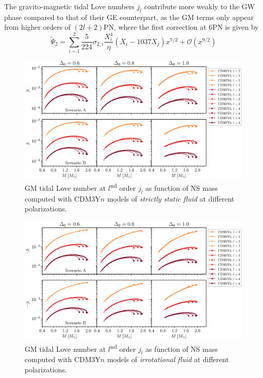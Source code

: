 The gravito-magnetic tidal Love numbers $j_l$ contribute more weakly to the \gls{GW} phase compared to that of their \gls{GE} counterpart, as the \gls{GM} terms only appear from higher orders of $(2l+2)$PN, where the first correction at 6PN is given by \citep{perot2021role,yagi2017erratum}
\begin{equation}
    \tilde{\Psi}_2 = \sum^{2}_{i=1} \frac{5}{224} \sigma_{2,i} \frac{X_i^4}{\eta} \left( X_i - 1037X_j \right)x^{7/2} + \mathcal{O}(x^{9/2})
\end{equation}
\begin{figure}[ht!]
        \centering
        \includegraphics[width=\textwidth]{fig/jl_stat.eps}
        \caption{\gls{GM} tidal Love number at $l$\textsuperscript{nd} order $j_l$ as function of \gls{NS} mass computed with CDM3Y$n$ models of \emph{strictly static fluid} at different polarizations.}
        \label{fig:jl_stat}
\end{figure} 
\begin{figure}[ht!]
        \centering
        \includegraphics[width=\textwidth]{fig/jl_irrot.eps}
        \caption{\gls{GM} tidal Love number at $l$\textsuperscript{nd} order $j_l$ as function of \gls{NS} mass computed with CDM3Y$n$ models of \emph{irrotational fluid} at different polarizations.}
        \label{fig:jl_irrot}
\end{figure} 
